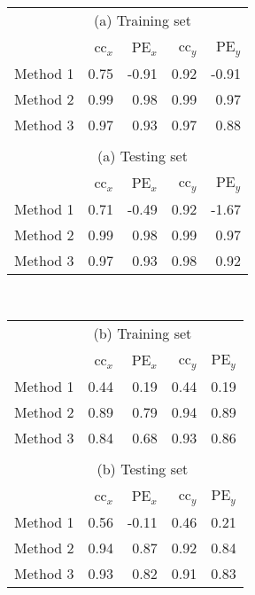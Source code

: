 \documentclass[linenumbers,draft]{agujournal}
\begin{document}
\clearpage

\begin{table}
  \begin{tabular}{ l r r r r }
& \multicolumn{3}{c}{(a) Training set}\\
& cc$_x$ & PE$_x$ & cc$_y$ & PE$_y$\\
\hline
Method 1 & 0.75 & -0.91 & 0.92 & -0.91\\
Method 2 & 0.99 & 0.98 & 0.99 & 0.97\\
Method 3 & 0.97 & 0.93 & 0.97 & 0.88\\
\\
& \multicolumn{3}{c}{(a) Testing set}\\
& cc$_x$ & PE$_x$ & cc$_y$ & PE$_y$\\
\hline
Method 1 & 0.71 & -0.49 & 0.92 & -1.67\\
Method 2 & 0.99 & 0.98 & 0.99 & 0.97\\
Method 3 & 0.97 & 0.93 & 0.98 & 0.92\\
%    
  \end{tabular}
\\
  \begin{tabular}{ l r r r r }
& \multicolumn{3}{c}{(b) Training set}\\
& cc$_x$ & PE$_x$ & cc$_y$ & PE$_y$\\
\hline
Method 1 & 0.44 & 0.19 & 0.44 & 0.19\\
Method 2 & 0.89 & 0.79 & 0.94 & 0.89\\
Method 3 & 0.84 & 0.68 & 0.93 & 0.86\\
\\
& \multicolumn{3}{c}{(b) Testing set}\\
& cc$_x$ & PE$_x$ & cc$_y$ & PE$_y$\\
\hline
Method 1 & 0.56 & -0.11 & 0.46 & 0.21\\
Method 2 & 0.94 & 0.87 & 0.92 & 0.84\\
Method 3 & 0.93 & 0.82 & 0.91 & 0.83\\
%    
  \end{tabular}
\end{table}
\clearpage
\end{document}
